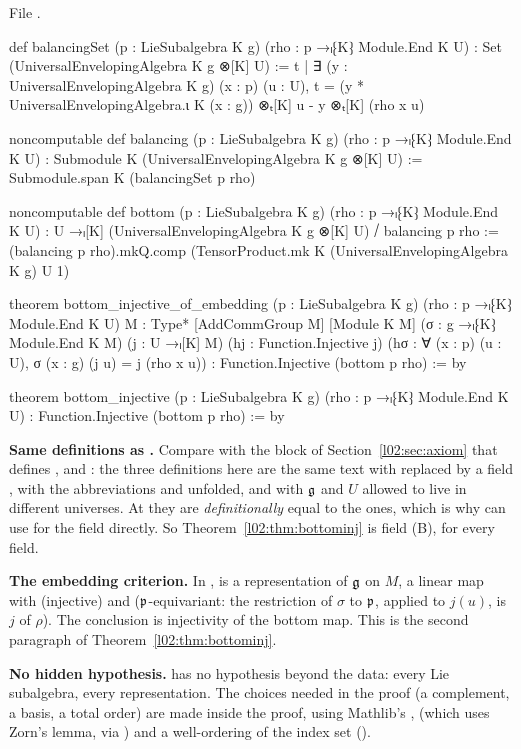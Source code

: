 File .
\begin{leancode}
def balancingSet (p : LieSubalgebra K g) (rho : p →ₗ⁅K⁆ Module.End K U) :
    Set (UniversalEnvelopingAlgebra K g ⊗[K] U) :=
  {t | ∃ (y : UniversalEnvelopingAlgebra K g) (x : p) (u : U),
    t = (y * UniversalEnvelopingAlgebra.ι K (x : g)) ⊗ₜ[K] u - y ⊗ₜ[K] (rho x u)}

noncomputable def balancing (p : LieSubalgebra K g) (rho : p →ₗ⁅K⁆ Module.End K U) :
    Submodule K (UniversalEnvelopingAlgebra K g ⊗[K] U) :=
  Submodule.span K (balancingSet p rho)

noncomputable def bottom (p : LieSubalgebra K g) (rho : p →ₗ⁅K⁆ Module.End K U) :
    U →ₗ[K] (UniversalEnvelopingAlgebra K g ⊗[K] U) ⧸ balancing p rho :=
  (balancing p rho).mkQ.comp (TensorProduct.mk K (UniversalEnvelopingAlgebra K g) U 1)

theorem bottom_injective_of_embedding (p : LieSubalgebra K g) (rho : p →ₗ⁅K⁆ Module.End K U)
    {M : Type*} [AddCommGroup M] [Module K M] (σ : g →ₗ⁅K⁆ Module.End K M) (j : U →ₗ[K] M)
    (hj : Function.Injective j) (hσ : ∀ (x : p) (u : U), σ (x : g) (j u) = j (rho x u)) :
    Function.Injective (bottom p rho) := by

theorem bottom_injective (p : LieSubalgebra K g) (rho : p →ₗ⁅K⁆ Module.End K U) :
    Function.Injective (bottom p rho) := by
\end{leancode}

\begin{dictionary}
\textbf{Same definitions as .} Compare with the block of
Section~\ref{l02:sec:axiom} that defines ,  and
: the three definitions here are the same text with  replaced by a field
, with the abbreviations  and  unfolded, and with $\mathfrak{g}$ and $U$
allowed to live in different universes. At  they are \emph{definitionally} equal to the
 ones, which is why  can use  for the field
 directly. So Theorem~\ref{l02:thm:bottominj} is field (B), for every field.

\textbf{The embedding criterion.} In ,  is a representation
of $\mathfrak{g}$ on $M$,  a linear map with  (injective) and  ($\mathfrak{p}$-equivariant: the
restriction of $\sigma$ to $\mathfrak{p}$, applied to $j(u)$, is $j$ of $\rho$). The conclusion is injectivity of
the bottom map. This is the second paragraph of Theorem~\ref{l02:thm:bottominj}.

\textbf{No hidden hypothesis.}  has no hypothesis beyond the data: every Lie
subalgebra, every representation. The choices needed in the proof (a complement, a basis, a total order)
are made inside the proof, using Mathlib's , 
(which uses Zorn's lemma, via ) and a well-ordering of the index set
().
\end{dictionary}

